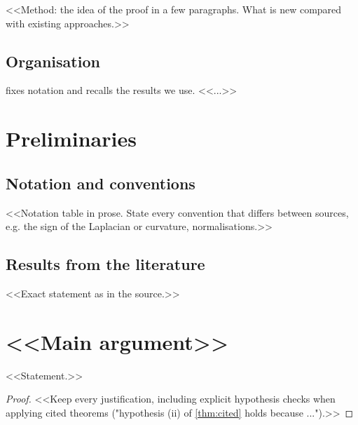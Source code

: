 
<<Method: the idea of the proof in a few paragraphs. What is new compared with
existing approaches.>>

\subsection*{Organisation}
 fixes notation and recalls the results we use.
<<...>>

\section{Preliminaries}\label{sec:prelim}

\subsection{Notation and conventions}
<<Notation table in prose. State every convention that differs between
sources, e.g. the sign of the Laplacian or curvature, normalisations.>>

\subsection{Results from the literature}
\begin{theorem}\label{thm:cited}
<<Exact statement as in the source.>>
\end{theorem}

\section{<<Main argument>>}\label{sec:main}

\begin{lemma}\label{lem:first}
<<Statement.>>
\end{lemma}

\begin{proof}
<<Keep every justification, including explicit hypothesis checks when
applying cited theorems ("hypothesis (ii) of \cref{thm:cited} holds because
...").>>
\end{proof}

